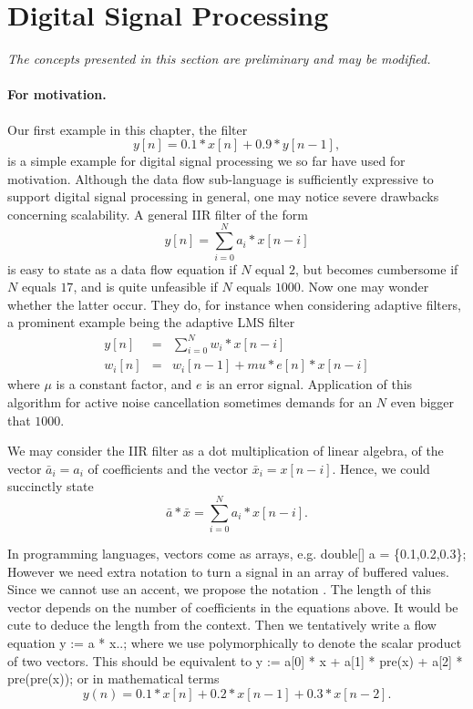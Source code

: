 \section{Digital Signal Processing}

\emph{The concepts presented in this section are preliminary and may be modified.
}
\paragraph{For motivation.} Our first example in this chapter, the filter
% 
$$y[n] = 0.1 * x[n] + 0.9 * y[n-1],$$
% 
is a simple example for digital signal processing we so far have used for motivation. 
Although the data flow sub-language is sufficiently expressive to support digital
signal processing in general, one may notice severe drawbacks concerning scalability.
A general IIR filter of the form
%
$$y[n] = \sum_{i=0}^{N} a_{i} *  x[n-i]$$
%
is easy to state as a data flow equation if $N$ equal $2$, but becomes cumbersome if $N$ equals $17$, and is quite unfeasible if $N$ equals $1000$. Now one may wonder whether the latter occur. They do, for instance when considering adaptive filters, a prominent example being the adaptive LMS filter
%
\begin{eqnarray*}
y[n]     & = & \sum_{i=0}^{N} w_{i} *  x[n-i]\\
w_{i}[n] & = & w_{i}[n-1] + mu * e[n] *  x[n-i]
\end{eqnarray*}
%
where $\mu$ is a constant factor, and $e$ is an error signal. Application of this algorithm for active noise cancellation sometimes demands for an $N$ even bigger that $1000$.

We may consider the IIR filter as a dot multiplication of linear algebra, of the vector $\bar{a}_{i} = a_{i}$ of coefficients and the vector $\bar{x}_{i} = x[n-i]$. Hence, we could succinctly state 
%
$$\bar{a} * \bar{x} = \sum_{i=0}^{N} a_{i} *  x[n-i].$$
%

In programming languages, vectors come as arrays, e.g.
%
\BEP
double[] a = \{0.1,0.2,0.3\};
\EEP
%
However we need extra notation to turn a signal in an array of buffered values.
 Since we cannot use an accent, we propose the notation . The length of this
 vector depends on the number of coefficients in the equations above. It would be cute to deduce the length from the context. Then we tentatively write a flow equation
%
\BEP
y := a * x..;
\EEP
%
where we use \pp{*} polymorphically to denote the scalar product of two vectors. This 
should be equivalent to
%
\BEP
y := a[0] * x + a[1] * pre(x) + a[2] * pre(pre(x));
\EEP
%
or in mathematical terms
%
$$y(n) = 0.1 * x[n] + 0.2 * x[n-1] + 0.3 * x[n-2].$$
%


